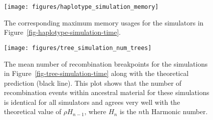 \documentclass[10pt]{article}
\begin{document}
\begin{figure}
    \begin{center}
        \texttt{[image: figures/haplotype\_simulation\_memory]}
    \end{center}
    \caption{\label{fig-haplotype-simulation-memory} The corresponding maximum
        memory usages for the simulators in Figure~\ref{fig-haplotype-simulation-time}.
        }
\end{figure}

\begin{figure}
    \begin{center}
        \texttt{[image: figures/tree\_simulation\_num\_trees]}
    \end{center}
    \caption{\label{fig-tree-simulation-num-trees} The  mean
        number of recombination breakpoints for the simulations in
        Figure~\ref{fig-tree-simulation-time} along with the theoretical prediction
        (black line). This plot shows that the number of recombination events within ancestral
        material for these simulations is identical for all simulators and agrees
        very well with the theoretical value of $\rho H_{n - 1}$, where
        $H_n$ is the $n$th Harmonic number.
        }
\end{figure}
\end{document}
